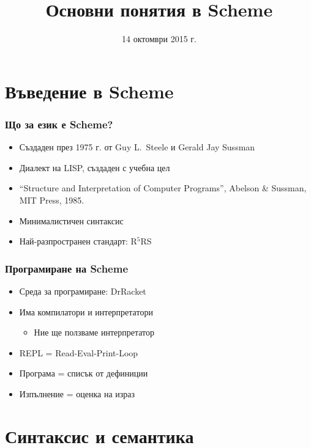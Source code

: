\documentclass{beamer}
\title{Основни понятия в Scheme}
\date{14 октомври 2015 г.}
\begin{document}
\begin{frame}
  \titlepage
\end{frame}

\section{Въведение в Scheme}

\begin{frame}
  \frametitle{Що за език е Scheme?}

  \begin{itemize}
  \item Създаден през 1975 г. от Guy L.~Steele и  Gerald Jay Sussman
  \item Диалект на LISP, създаден с учебна цел
  \item ``Structure and Interpretation of Computer Programs'', Abelson \& Sussman, MIT Press, 1985.
  \item Минималистичен синтаксис
  \item Най-разпространен стандарт: R$^5$RS
  \end{itemize}
\end{frame}

\begin{frame}
  \frametitle{Програмиране на Scheme}

  \begin{itemize}
  \item Среда за програмиране: DrRacket
  \item Има компилатори и интерпретатори
    \begin{itemize}
    \item Ние ще ползваме интерпретатор
    \end{itemize}
  \item REPL = Read-Eval-Print-Loop
  \item Програма = списък от дефиниции
  \item Изпълнение = оценка на израз
  \end{itemize}
\end{frame}

\section{Синтаксис и семантика}
\end{document}
